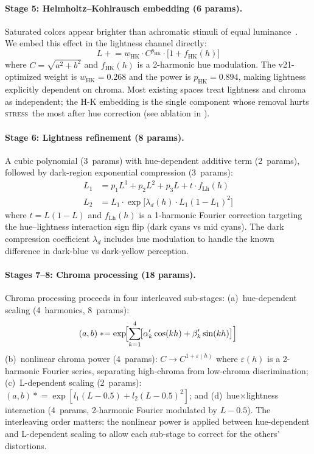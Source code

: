 \documentclass[11pt, twocolumn]{article}
\newcommand{\stress}{\textsc{stress}}
\begin{document}
\paragraph{Stage 5: Helmholtz--Kohlrausch embedding (6 params).}
Saturated colors appear brighter than achromatic stimuli of equal
luminance~\cite{cie1976}. We embed this effect in the lightness
channel directly:
\begin{equation}
  L \mathrel{+}= w_\mathrm{HK} \cdot C^{p_\mathrm{HK}} \cdot \bigl[1 + f_\mathrm{HK}(h)\bigr]
  \label{eq:hk}
\end{equation}
where $C = \sqrt{a^2+b^2}$ and $f_\mathrm{HK}(h)$ is a 2-harmonic
hue modulation. The v21-optimized weight is $w_\mathrm{HK} = 0.268$
and the power is $p_\mathrm{HK} = 0.894$, making lightness explicitly
dependent on chroma. Most existing spaces treat lightness and chroma
as independent; the H-K embedding is the single component whose
removal hurts \stress\ the most after hue correction
(see ablation in ).

\paragraph{Stage 6: Lightness refinement (8 params).}
A cubic polynomial (3~params) with hue-dependent additive term
(2~params), followed by dark-region exponential compression (3~params):
\begin{align}
  L_1 &= p_1 L^3 + p_2 L^2 + p_3 L + t \cdot f_\mathrm{Lh}(h) \\
  L_2 &= L_1 \cdot \exp\!\bigl[\lambda_d(h) \cdot L_1(1-L_1)^2\bigr]
\end{align}
where $t = L(1-L)$ and $f_\mathrm{Lh}(h)$ is a 1-harmonic Fourier
correction targeting the hue--lightness interaction sign flip (dark
cyans vs mid cyans). The dark compression coefficient $\lambda_d$
includes hue modulation to handle the known difference in dark-blue
vs dark-yellow perception.

\paragraph{Stages 7--8: Chroma processing (18 params).}
Chroma processing proceeds in four interleaved sub-stages:
(a)~hue-dependent scaling (4~harmonics, 8~params):
\begin{equation}
  (a,b) \mathrel{*}= \exp\!\Bigl[\sum_{k=1}^{4}\!\bigl[\alpha'_k\cos(kh) + \beta'_k\sin(kh)\bigr]\Bigr]
\end{equation}
(b)~nonlinear chroma power (4~params): $C \to C^{1+\varepsilon(h)}$
where $\varepsilon(h)$ is a 2-harmonic Fourier series, separating
high-chroma from low-chroma discrimination;
(c)~L-dependent scaling (2~params):
$(a,b) \mathrel{*}= \exp[l_1(L-0.5) + l_2(L-0.5)^2]$; and
(d)~hue$\times$lightness interaction (4~params, 2-harmonic Fourier
modulated by $L-0.5$). The interleaving order matters: the nonlinear
power is applied between hue-dependent and L-dependent scaling to
allow each sub-stage to correct for the others' distortions.
\end{document}
